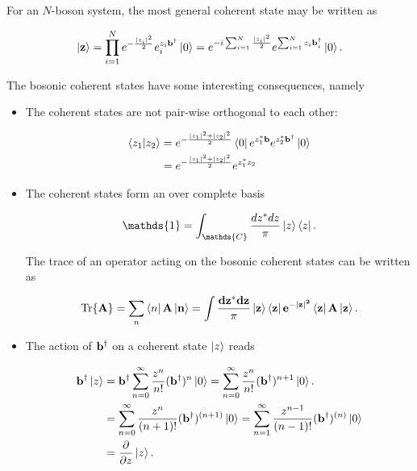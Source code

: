 \documentclass{homework}
\begin{document}
For an $N$-boson system, the most general coherent state may be written as 

\begin{equation}
    \ket{{\bf z}} = \prod_{i=1}^N e^{-\frac{|z_i|^2}{2}} e^{z_i {\bf b}^\dagger}_i \ket{0} = e^{-i \sum_{i=1}^N \frac{|z_i|^2}{2}} e^{\sum_{i=1}^N z_i {\bf b}_i^\dagger} \ket{0}.
\end{equation}

The bosonic coherent states have some interesting consequences, namely 

\begin{itemize}
    \item The coherent states are not pair-wise orthogonal to each other:
    
    \begin{equation}
        \begin{split}
            \bra{z_1}\ket{z_2} &= e^{-\frac{|z_1|^2+|z_2|^2}{2}} \bra{0} e^{z_1^* {\bf b}} e^{z_2^* {\bf b}^\dagger} \ket{0} \\
            &= e^{-\frac{|z_1|^2+|z_2|^2}{2}} e^{z_1^* z_2}
        \end{split}
    \end{equation}
    
    \item The coherent states form an over complete basis
    
    $$
    \mathds{1} = \int_{\mathds{C}} \frac{dz^* dz}{\pi} \ket{z} \bra{z}.
    $$
    
    The trace of an operator acting on the bosonic coherent states can be written as 
    
    $$
        \Tr {\bf A} = \sum_n \bra{n} {\bf A} \ket{n} = \int \frac{dz^* dz}{\pi} \ket{z} \bra{z} e^{-|z|^2} \bra{z}{\bf A}\ket{z}.
    $$
    
    \item The action of ${\bf b}^\dagger$ on a coherent state $\ket{z}$ reads
    
    \begin{equation}
        \begin{split}
            {\bf b}^\dagger \ket{z} &= {\bf b}^\dagger \sum_{n=0}^{\infty} \frac{z^n}{n!} ({\bf b}^\dagger )^{n} \ket{0} = \sum_{n=0}^{\infty} \frac{z^n}{n!} ({\bf b}^\dagger )^{n+1} \ket{0}. \\
            &= \sum_{n=0}^{\infty} \frac{z^n}{(n+1)!} ({\bf b}^\dagger )^{(n+1)} \ket{0} = \sum_{n=1}^{\infty} \frac{z^{n-1}}{(n-1)!} ({\bf b}^\dagger)^{(n)} \ket{0}\\
            &= \frac{\partial}{\partial z} \ket{z}.
        \end{split}
    \end{equation}
    

\end{itemize}
\end{document}
